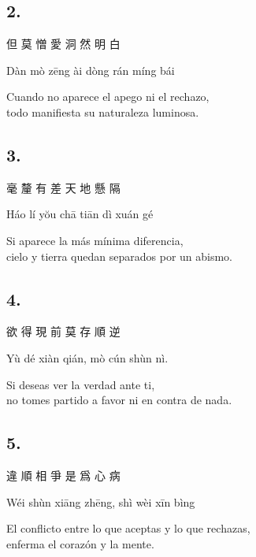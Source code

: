 \documentclass[
  a5paperpaper,
]{article}
\begin{document}
\begin{verseblock}

\hypertarget{section-76}{%
\subsection{2.}\label{section-76}}

但 莫 憎 愛 洞 然 明 白

Dàn mò zēng ài dòng rán míng bái

Cuando no aparece el apego ni el rechazo,\\
todo manifiesta su naturaleza luminosa.

\end{verseblock}

\begin{verseblock}

\hypertarget{section-77}{%
\subsection{3.}\label{section-77}}

毫 釐 有 差 天 地 懸 隔

Háo lí yŏu chā tiān dì xuán gé

Si aparece la más mínima diferencia,\\
cielo y tierra quedan separados por un abismo.

\end{verseblock}

\begin{verseblock}

\hypertarget{section-78}{%
\subsection{4.}\label{section-78}}

欲 得 現 前 莫 存 順 逆

Yù dé xiàn qián, mò cún shùn nì.

Si deseas ver la verdad ante ti,\\
no tomes partido a favor ni en contra de nada.

\end{verseblock}

\begin{verseblock}

\hypertarget{section-79}{%
\subsection{5.}\label{section-79}}

違 順 相 爭 是 爲 心 病

Wéi shùn xiāng zhēng, shì wèi xīn bìng

El conflicto entre lo que aceptas y lo que rechazas,\\
enferma el corazón y la mente.

\end{verseblock}
\end{document}
